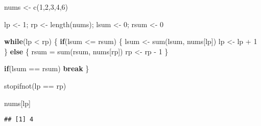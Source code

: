 \documentclass[
]{article}
\newenvironment{Shaded}{\begin{snugshade}}{\end{snugshade}}
\newcommand{\ControlFlowTok}[1]{\textcolor[rgb]{0.13,0.29,0.53}{\textbf{#1}}}
\newcommand{\DecValTok}[1]{\textcolor[rgb]{0.00,0.00,0.81}{#1}}
\newcommand{\FunctionTok}[1]{\textcolor[rgb]{0.00,0.00,0.00}{#1}}
\newcommand{\NormalTok}[1]{#1}
\newcommand{\OtherTok}[1]{\textcolor[rgb]{0.56,0.35,0.01}{#1}}
\newcommand{\SpecialCharTok}[1]{\textcolor[rgb]{0.00,0.00,0.00}{#1}}
\begin{document}
\begin{Shaded}
\begin{Highlighting}[]
\NormalTok{nums }\OtherTok{\textless{}{-}} \FunctionTok{c}\NormalTok{(}\DecValTok{1}\NormalTok{,}\DecValTok{2}\NormalTok{,}\DecValTok{3}\NormalTok{,}\DecValTok{4}\NormalTok{,}\DecValTok{6}\NormalTok{)}

\NormalTok{lp }\OtherTok{\textless{}{-}} \DecValTok{1}\NormalTok{; rp }\OtherTok{\textless{}{-}} \FunctionTok{length}\NormalTok{(nums);}
\NormalTok{lsum }\OtherTok{\textless{}{-}} \DecValTok{0}\NormalTok{; rsum }\OtherTok{\textless{}{-}} \DecValTok{0}

\ControlFlowTok{while}\NormalTok{(lp }\SpecialCharTok{\textless{}}\NormalTok{ rp) \{}
  \ControlFlowTok{if}\NormalTok{(lsum }\SpecialCharTok{\textless{}=}\NormalTok{ rsum) \{}
\NormalTok{    lsum }\OtherTok{\textless{}{-}} \FunctionTok{sum}\NormalTok{(lsum, nums[lp])}
\NormalTok{    lp }\OtherTok{\textless{}{-}}\NormalTok{ lp }\SpecialCharTok{+} \DecValTok{1}
\NormalTok{  \} }\ControlFlowTok{else}\NormalTok{ \{}
\NormalTok{    rsum }\OtherTok{=} \FunctionTok{sum}\NormalTok{(rsum, nums[rp])}
\NormalTok{    rp }\OtherTok{\textless{}{-}}\NormalTok{ rp }\SpecialCharTok{{-}} \DecValTok{1}
\NormalTok{  \}}
  
  \ControlFlowTok{if}\NormalTok{(lsum }\SpecialCharTok{==}\NormalTok{ rsum)}
    \ControlFlowTok{break}
\NormalTok{\}}

\FunctionTok{stopifnot}\NormalTok{(lp }\SpecialCharTok{==}\NormalTok{ rp)}

\NormalTok{nums[lp]}
\end{Highlighting}
\end{Shaded}

\begin{verbatim}
## [1] 4
\end{verbatim}
\end{document}
